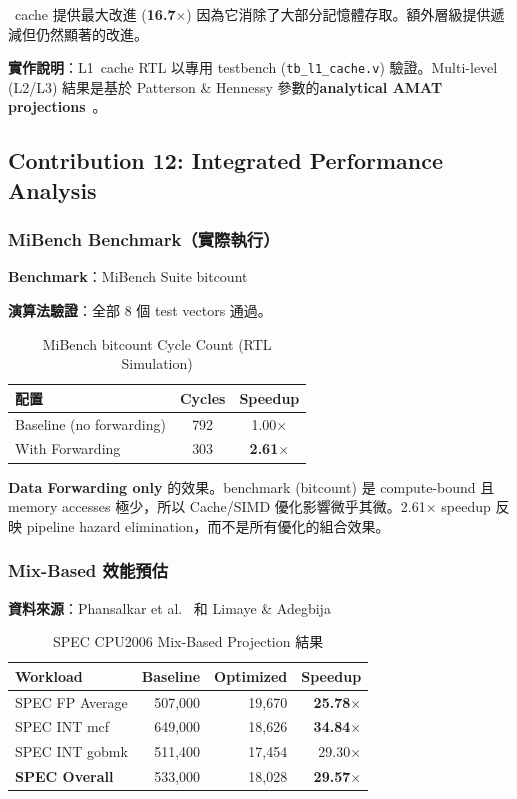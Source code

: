 \documentclass[journal]{IEEEtran}
\newcommand{\tagit}[1]{\textit{#1}}
\newcommand{\Note}{\tagit{注意：}}
\begin{document}
~cache 提供最大改進 (\textbf{16.7$\times$}) 因為它消除了大部分記憶體存取。額外層級提供遞減但仍然顯著的改進。

\textbf{實作說明}：L1~cache RTL 以專用 testbench (\texttt{tb\_l1\_cache.v}) 驗證。Multi-level (L2/L3) 結果是基於 Patterson \& Hennessy 參數的\textbf{analytical AMAT projections}~\cite{hennessy2017computer}。

\subsection{Contribution 12: Integrated Performance Analysis}

\subsubsection{MiBench Benchmark（實際執行）}
\textbf{Benchmark}：MiBench Suite bitcount~\cite{guthaus2001mibench}

\textbf{演算法驗證}：全部 8 個 test vectors 通過。

\begin{table}[!t]
\centering
\caption{MiBench bitcount Cycle Count (RTL Simulation)}
\label{tab:mibench}
\footnotesize
\begin{tabular}{@{}lcc@{}}
\toprule
\textbf{配置} & \textbf{Cycles} & \textbf{Speedup} \\
\midrule
Baseline (no forwarding) & 792 & 1.00$\times$ \\
With Forwarding & 303 & \textbf{2.61$\times$} \\
\bottomrule
\end{tabular}
\end{table}

 \textbf{Data Forwarding only} 的效果。benchmark (bitcount) 是 compute-bound 且 memory accesses 極少，所以 Cache/SIMD 優化影響微乎其微。2.61$\times$ speedup 反映 pipeline hazard elimination，而不是所有優化的組合效果。

\subsubsection{Mix-Based 效能預估}
\textbf{資料來源}：Phansalkar et al.~\cite{phansalkar2007analysis} 和 Limaye \& Adegbija~\cite{limaye2018workload}

\begin{table}[!t]
\centering
\caption{SPEC CPU2006 Mix-Based Projection 結果}
\label{tab:specresults}
\footnotesize
\begin{tabular}{@{}lrrr@{}}
\toprule
\textbf{Workload} & \textbf{Baseline} & \textbf{Optimized} & \textbf{Speedup} \\
\midrule
SPEC FP Average & 507,000 & 19,670 & \textbf{25.78$\times$} \\
SPEC INT mcf & 649,000 & 18,626 & \textbf{34.84$\times$} \\
SPEC INT gobmk & 511,400 & 17,454 & 29.30$\times$ \\
\textbf{SPEC Overall} & 533,000 & 18,028 & \textbf{29.57$\times$} \\
\bottomrule
\end{tabular}
\end{table}
\end{document}
